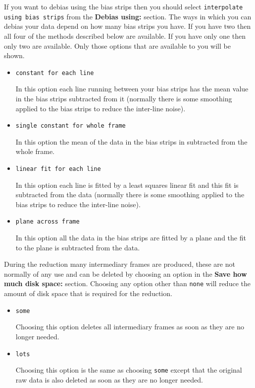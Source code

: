 \documentclass[11pt]{article}
\newcommand{\xlabel}[1]{}
\newcommand{\wlab}[1]{{\bf #1}}
\newcommand{\text}[1]{{\tt #1}}
\begin{document}
If\xlabel{CCDReduceInterpolation} you want to debias using the bias
strips then you should select
\text{interpolate using bias strips} from the \wlab{Debias using:}
section. The ways in which you can debias your data depend on how many
bias strips you have. If you have two then all four of the methods
described below are available. If you have only one then only two are
available. Only those options that are available to you will be shown.

\begin{itemize}
\item \text{constant for each line}

In this option each line running between your bias strips has the mean
value in the bias strips subtracted from it (normally there is some
smoothing applied to the bias strips to reduce the inter-line noise).

\item \text{single constant for whole frame}

In this option the mean of the data in the bias strips in subtracted
from the whole frame.

\item \text{linear fit for each line}

In this option each line is fitted by a least squares linear fit and
this fit is subtracted from the data (normally there is some smoothing
applied to the bias strips to reduce the inter-line noise).

\item \text{plane across frame}

In this option all the data in the bias strips are fitted by a
plane and the fit to the plane is subtracted from the data.
\end{itemize}

\xlabel{CCDReduceSavespace}

During the reduction many intermediary frames are produced, these are
not normally of any use and can be deleted by choosing an option in
the \wlab{Save how much disk space:} section. Choosing any option
other than \text{none} will reduce the amount of disk space that
is required for the reduction.

\begin{itemize}
\item \text{some}

Choosing this option deletes all intermediary frames as soon as they
are no longer needed.

\item \text{lots}

Choosing this option is the same as choosing \text{some} except that
the original raw data is also deleted as soon as they are no longer
needed.

\end{itemize}
\end{document}
